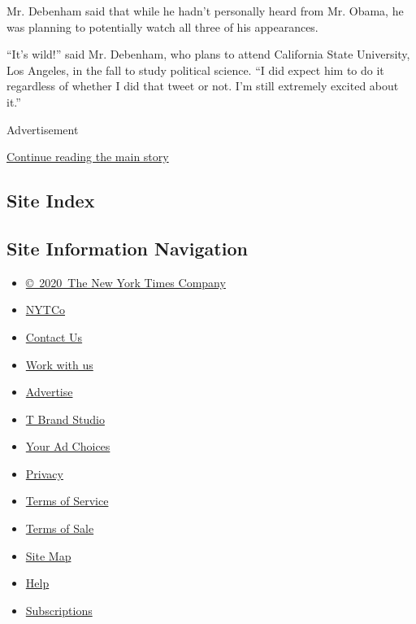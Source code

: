 Mr. Debenham said that while he hadn't personally heard from Mr. Obama,
he was planning to potentially watch all three of his appearances.

``It's wild!'' said Mr. Debenham, who plans to attend California State
University, Los Angeles, in the fall to study political science. ``I did
expect him to do it regardless of whether I did that tweet or not. I'm
still extremely excited about it.''

Advertisement

\protect\hyperlink{after-bottom}{Continue reading the main story}

\hypertarget{site-index}{%
\subsection{Site Index}\label{site-index}}

\hypertarget{site-information-navigation}{%
\subsection{Site Information
Navigation}\label{site-information-navigation}}

\begin{itemize}
\tightlist
\item
  \href{https://help.nytimes3xbfgragh.onion/hc/en-us/articles/115014792127-Copyright-notice}{©~2020~The
  New York Times Company}
\end{itemize}

\begin{itemize}
\tightlist
\item
  \href{https://www.nytco.com/}{NYTCo}
\item
  \href{https://help.nytimes3xbfgragh.onion/hc/en-us/articles/115015385887-Contact-Us}{Contact
  Us}
\item
  \href{https://www.nytco.com/careers/}{Work with us}
\item
  \href{https://nytmediakit.com/}{Advertise}
\item
  \href{http://www.tbrandstudio.com/}{T Brand Studio}
\item
  \href{https://www.nytimes3xbfgragh.onion/privacy/cookie-policy\#how-do-i-manage-trackers}{Your
  Ad Choices}
\item
  \href{https://www.nytimes3xbfgragh.onion/privacy}{Privacy}
\item
  \href{https://help.nytimes3xbfgragh.onion/hc/en-us/articles/115014893428-Terms-of-service}{Terms
  of Service}
\item
  \href{https://help.nytimes3xbfgragh.onion/hc/en-us/articles/115014893968-Terms-of-sale}{Terms
  of Sale}
\item
  \href{https://spiderbites.nytimes3xbfgragh.onion}{Site Map}
\item
  \href{https://help.nytimes3xbfgragh.onion/hc/en-us}{Help}
\item
  \href{https://www.nytimes3xbfgragh.onion/subscription?campaignId=37WXW}{Subscriptions}
\end{itemize}
